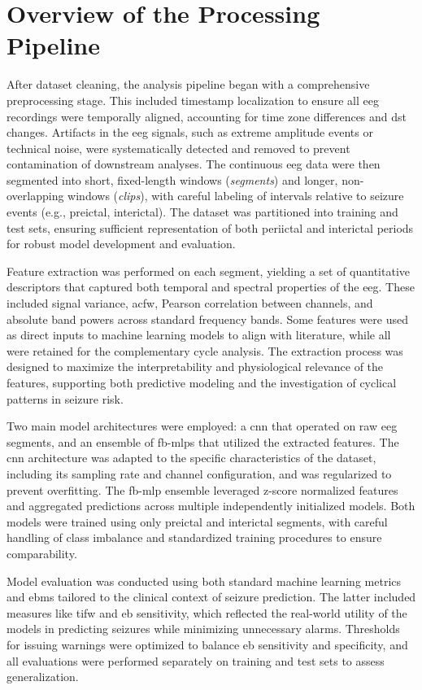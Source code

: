 \section{Overview of the Processing Pipeline} \label{sec:pipeline-overview}

After dataset cleaning, the analysis pipeline began with a comprehensive preprocessing stage.
This included timestamp localization to ensure all \gls{eeg} recordings were temporally aligned, accounting for time zone differences and \gls{dst} changes.
Artifacts in the \gls{eeg} signals, such as extreme amplitude events or technical noise, were systematically detected and removed to prevent contamination of downstream analyses.
The continuous \gls{eeg} data were then segmented into short, fixed-length windows (\textit{segments}) and longer, non-overlapping windows (\textit{clips}), with careful labeling of intervals relative to seizure events (e.g., preictal, interictal).
The dataset was partitioned into training and test sets, ensuring sufficient representation of both periictal and interictal periods for robust model development and evaluation.

Feature extraction was performed on each segment, yielding a set of quantitative descriptors that captured both temporal and spectral properties of the \gls{eeg}.
These included signal variance, \gls{acfw}, Pearson correlation between channels, and absolute band powers across standard frequency bands.
Some features were used as direct inputs to machine learning models to align with literature, while all were retained for the complementary cycle analysis.
The extraction process was designed to maximize the interpretability and physiological relevance of the features, supporting both predictive modeling and the investigation of cyclical patterns in seizure risk.

Two main model architectures were employed: a \gls{cnn} that operated on raw \gls{eeg} segments, and an ensemble of \glspl{fb-mlp} that utilized the extracted features.
The \gls{cnn} architecture was adapted to the specific characteristics of the dataset, including its sampling rate and channel configuration, and was regularized to prevent overfitting.
The \gls{fb-mlp} ensemble leveraged z-score normalized features and aggregated predictions across multiple independently initialized models.
Both models were trained using only preictal and interictal segments, with careful handling of class imbalance and standardized training procedures to ensure comparability.

Model evaluation was conducted using both standard machine learning metrics and \glspl{ebm} tailored to the clinical context of seizure prediction.
The latter included measures like \gls{tifw} and \gls{eb} sensitivity, which reflected the real-world utility of the models in predicting seizures while minimizing unnecessary alarms.
Thresholds for issuing warnings were optimized to balance \gls{eb} sensitivity and specificity, and all evaluations were performed separately on training and test sets to assess generalization.

